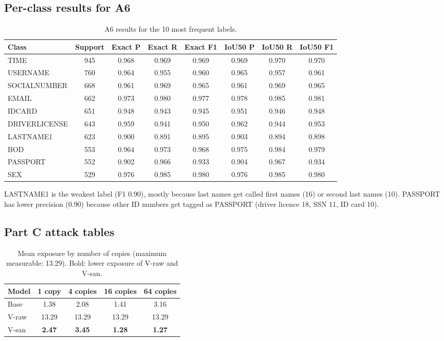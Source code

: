 \documentclass[10pt]{article}
\begin{document}
\subsection{Per-class results for A6}\label{app:perclass}
\begin{table}[h!]
\centering
\caption{A6 results for the 10 most frequent labels.}
\label{tab:partB-perclass}
\begin{tabular}{@{}lccccccc@{}}
\toprule
Class & Support & Exact P & Exact R & Exact F1 & IoU50 P & IoU50 R & IoU50 F1 \\
\midrule
TIME & 945 & 0.968 & 0.969 & 0.969 & 0.969 & 0.970 & 0.970 \\
USERNAME & 760 & 0.964 & 0.955 & 0.960 & 0.965 & 0.957 & 0.961 \\
SOCIALNUMBER & 668 & 0.961 & 0.969 & 0.965 & 0.961 & 0.969 & 0.965 \\
EMAIL & 662 & 0.973 & 0.980 & 0.977 & 0.978 & 0.985 & 0.981 \\
IDCARD & 651 & 0.948 & 0.943 & 0.945 & 0.951 & 0.946 & 0.948 \\
DRIVERLICENSE & 643 & 0.959 & 0.941 & 0.950 & 0.962 & 0.944 & 0.953 \\
LASTNAME1 & 623 & 0.900 & 0.891 & 0.895 & 0.903 & 0.894 & 0.898 \\
BOD & 553 & 0.964 & 0.973 & 0.968 & 0.975 & 0.984 & 0.979 \\
PASSPORT & 552 & 0.902 & 0.966 & 0.933 & 0.904 & 0.967 & 0.934 \\
SEX & 529 & 0.976 & 0.985 & 0.980 & 0.976 & 0.985 & 0.980 \\
\bottomrule
\end{tabular}
\end{table}

\noindent LASTNAME1 is the weakest label (F1 0.90), mostly because last names get called first names (16) or second last names (10). PASSPORT has lower precision (0.90) because other ID numbers get tagged as PASSPORT (driver licence 18, SSN 11, ID card 10).

\subsection{Part C attack tables}\label{app:canary}
\begin{table}[h!]
\centering
\caption{Mean exposure by number of copies (maximum measurable: 13.29). Bold: lower exposure of V-raw and V-san.}
\label{tab:partC-canary}
\begin{tabular}{@{}lcccc@{}}
\toprule
Model & 1 copy & 4 copies & 16 copies & 64 copies \\
\midrule
Base  & 1.38 & 2.08 & 1.41 & 3.16 \\
V-raw & 13.29 & 13.29 & 13.29 & 13.29 \\
V-san & \textbf{2.47} & \textbf{3.45} & \textbf{1.28} & \textbf{1.27} \\
\bottomrule
\end{tabular}
\end{table}
\end{document}
